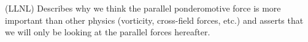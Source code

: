 (LLNL) Describes why we think the parallel ponderomotive force is more important than
other physics (vorticity, cross-field forces, etc.) and asserts that we will only be
looking at the parallel forces hereafter.
